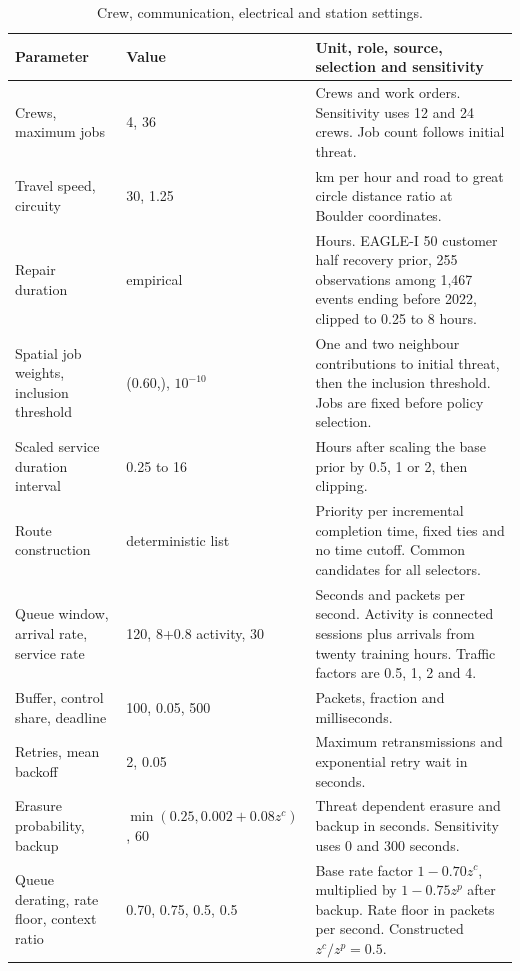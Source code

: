 \documentclass[journal]{IEEEtran}
\newcommand{\DIFnewtablecolor}{\color{blue}}
\begin{document}
\begin{table}[p]\DIFnewtablecolor
\centering
\caption{Crew, communication, electrical and station settings.}
\label{tab:execution-parameters}
\footnotesize\setlength{\tabcolsep}{4pt}\renewcommand{\arraystretch}{1.0}
\begin{tabular}{@{}p{}p{}p{}@{}}
\toprule Parameter & Value & Unit, role, source, selection and sensitivity \\ \midrule
Crews, maximum jobs & 4, 36 & Crews and work orders. Sensitivity uses 12 and 24 crews. Job count follows initial threat. \\
Travel speed, circuity & 30, 1.25 & km per hour and road to great circle distance ratio at Boulder coordinates. \\
Repair duration & empirical & Hours. EAGLE-I 50 customer half recovery prior, 255 observations among 1,467 events ending before 2022, clipped to 0.25 to 8 hours. \\
Spatial job weights, inclusion threshold & (0.60,\allowbreak 0.30), $10^{-10}$ & One and two neighbour contributions to initial threat, then the inclusion threshold. Jobs are fixed before policy selection. \\
Scaled service duration interval & 0.25 to 16 & Hours after scaling the base prior by 0.5, 1 or 2, then clipping. \\
Route construction & deterministic list & Priority per incremental completion time, fixed ties and no time cutoff. Common candidates for all selectors. \\
Queue window, arrival rate, service rate & 120, 8+\allowbreak{}0.8 activity, 30 & Seconds and packets per second. Activity is connected sessions plus arrivals from twenty training hours. Traffic factors are 0.5, 1, 2 and 4. \\
Buffer, control share, deadline & 100, 0.05, 500 & Packets, fraction and milliseconds. \\
Retries, mean backoff & 2, 0.05 & Maximum retransmissions and exponential retry wait in seconds. \\
Erasure probability, backup & $\min(0.25,\allowbreak 0.002+\allowbreak 0.08z^c)$, 60 & Threat dependent erasure and backup in seconds. Sensitivity uses 0 and 300 seconds. \\
Queue derating, rate floor, context ratio & 0.70, 0.75, 0.5, 0.5 & Base rate factor $1-0.70z^c$, multiplied by $1-0.75z^p$ after backup. Rate floor in packets per second. Constructed $z^c/z^p=0.5$. \\

\end{tabular}
\end{table}
\end{document}
